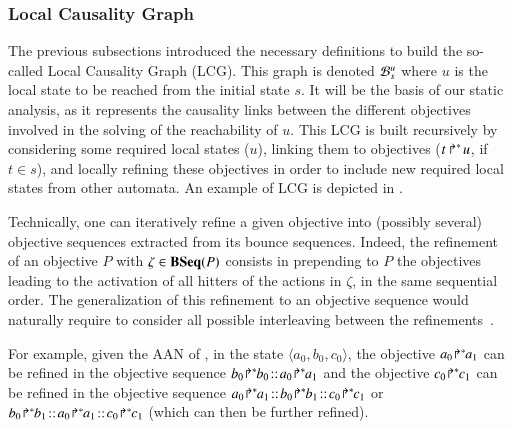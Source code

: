\subsubsection{Local Causality Graph}

The previous subsections introduced the necessary definitions to build the
so-called Local Causality Graph (LCG).
This graph is denoted ${\mathcal{B}_{s}^{u}}$ where $u$ is the local state to be reached
from the initial state $s$.
It will be the basis of our static analysis,
as it represents the causality links between the different objectives involved
in the solving of the reachability of $u$.
This LCG is built recursively by considering some required local states (\eg $u$),
linking them to objectives (\eg $\mbox{$t\Rsh^*\!u$}$, if $t \in s$),
and locally refining these objectives in order to include new required local states
from other automata.
An example of LCG is depicted in .

Technically,
one can iteratively refine a given objective into (possibly several) objective
sequences extracted from its bounce sequences.
Indeed, the refinement of an objective $P$ with $\zeta\in\mathbf{BSeq}(P)$
consists in prepending to $P$ the
objectives leading to the activation of all hitters of the actions in $\zeta$,
in the same sequential order.
The generalization of this refinement to an objective sequence would
naturally require to consider all possible
interleaving between the refinements~\cite{PMR12-MSCS}.

For example, given the AAN of ,
in the state $\langle a_0,b_0,c_0\rangle$,
the objective ${a_0\!\Rsh^*\!\!a_1}$ can be refined in the objective sequence
$\obj{b_0}{b_0}\concat\obj{a_0}{a_1}$
and
the objective ${c_0\!\Rsh^*\!\!c_1}$ can be refined in the objective sequence
$\obj{a_0}{a_1}\concat\obj{b_0}{b_1}\concat\obj{c_0}{c_1}$
or
$\obj{b_0}{b_1}\concat\obj{a_0}{a_1}\concat\obj{c_0}{c_1}$
(which can then be further refined).

\medskip

